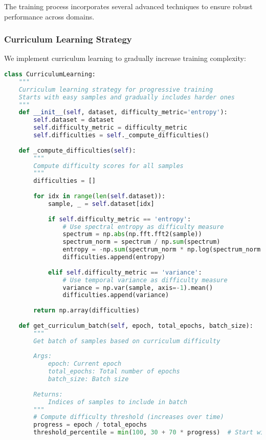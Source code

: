 \documentclass[journal]{IEEEtran}
\begin{document}
The training process incorporates several advanced techniques to ensure robust performance across domains.

\subsubsection{Curriculum Learning Strategy}

We implement curriculum learning to gradually increase training complexity:

\begin{lstlisting}[language=Python, caption=Curriculum Learning Implementation]
class CurriculumLearning:
    """
    Curriculum learning strategy for progressive training
    Starts with easy samples and gradually includes harder ones
    """
    def __init__(self, dataset, difficulty_metric='entropy'):
        self.dataset = dataset
        self.difficulty_metric = difficulty_metric
        self.difficulties = self._compute_difficulties()
        
    def _compute_difficulties(self):
        """
        Compute difficulty scores for all samples
        """
        difficulties = []
        
        for idx in range(len(self.dataset)):
            sample, _ = self.dataset[idx]
            
            if self.difficulty_metric == 'entropy':
                # Use spectral entropy as difficulty measure
                spectrum = np.abs(np.fft.fft2(sample))
                spectrum_norm = spectrum / np.sum(spectrum)
                entropy = -np.sum(spectrum_norm * np.log(spectrum_norm + 1e-10))
                difficulties.append(entropy)
                
            elif self.difficulty_metric == 'variance':
                # Use temporal variance as difficulty measure
                variance = np.var(sample, axis=-1).mean()
                difficulties.append(variance)
                
        return np.array(difficulties)
    
    def get_curriculum_batch(self, epoch, total_epochs, batch_size):
        """
        Get batch of samples based on curriculum difficulty
        
        Args:
            epoch: Current epoch
            total_epochs: Total number of epochs
            batch_size: Batch size
        
        Returns:
            Indices of samples to include in batch
        """
        # Compute difficulty threshold (increases over time)
        progress = epoch / total_epochs
        threshold_percentile = min(100, 30 + 70 * progress)  # Start with easiest 30%
        

\end{lstlisting}
\end{document}
